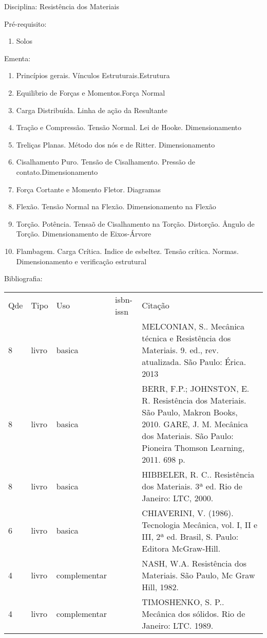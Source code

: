 \documentclass[12pt,a4paper,twoside]{report}
\begin{document}
Disciplina: Resistência dos Materiais

Pré-requisito:
\begin{enumerate}
\item Solos
\end{enumerate}

Ementa:
\begin{enumerate}
\item Princípios gerais. Vínculos Estruturais.Estrutura
\item Equilibrio de Forças e Momentos.Força Normal
\item Carga Distribuída. Linha de ação da Resultante
\item Tração e Compressão. Tensão Normal. Lei de Hooke. Dimensionamento
\item Treliças Planas. Método dos nós e de Ritter. Dimensionamento
\item Cisalhamento Puro. Tensão de Cisalhamento. Pressão de contato.Dimensionamento
\item Força Cortante e Momento Fletor. Diagramas
\item Flexão. Tensão Normal na Flexão. Dimensionamento na Flexão
\item Torção. Potência. Tensaõ de Cisalhamento na Torção. Distorção. Ângulo de Torção. Dimensionamento de Eixos-Árvore
\item Flambagem. Carga Crítica. Indice de esbeltez. Tensão crítica. Normas. Dimensionamento e verificação estrutural
\end{enumerate}

Bibliografia:
\begin{tabular}{lllll}
Qde & Tipo & Uso & isbn-issn & Citação \\
8&livro&basica&&MELCONIAN, S.. Mecânica técnica e Resistência dos Materiais. 9. ed., rev. atualizada. São Paulo: Érica. 2013\\
8&livro&basica&&BERR, F.P.; JOHNSTON, E. R. Resistência dos Materiais. São Paulo, Makron Books, 2010. GARE, J. M. Mecânica dos Materiais. São Paulo: Pioneira Thomson Learning, 2011. 698 p.\\
8&livro&basica&&HIBBELER, R. C.. Resistência dos Materiais. 3ª ed. Rio de Janeiro: LTC, 2000.\\
6&livro&basica&&CHIAVERINI, V. (1986). Tecnologia Mecânica, vol. I, II e III, 2ª ed. Brasil, S. Paulo: Editora McGraw-Hill.\\
4&livro&complementar&&NASH, W.A. Resistência dos Materiais. São Paulo, Mc Graw Hill, 1982.\\
4&livro&complementar&&TIMOSHENKO, S. P.. Mecânica dos sólidos. Rio de Janeiro: LTC. 1989.\\
\end{tabular}
\end{document}
